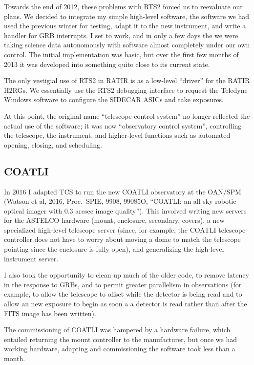 \documentclass{article}
\begin{document}
Towards the end of 2012, these problems with RTS2 forced us to reevaluate our plans. We decided to integrate my simple high-level software, the software we had used the previous winter for testing, adapt it to the new instrument, and write a handler for GRB interrupts. I set to work, and in only a few days the we were taking science data autonomously with software almost completely under our own control. The initial implementation was basic, but over the first few months of 2013 it was developed into something quite close to its current state.

The only vestigial use of RTS2 in RATIR is as a low-level “driver” for the RATIR H2RGs. We essentially use the RTS2 debugging interface to request the Teledyne Windows software to configure the SIDECAR ASICs and take exposures.

At this point, the original name “telescope control system” no longer reflected the actual use of the software; it was now “observatory control system”, controlling the telescope, the instrument, and higher-level functions such as automated opening, closing, and scheduling.

\subsection{COATLI}

In 2016 I adapted TCS to run the new COATLI observatory at the OAN/SPM (Watson et al, 2016, Proc.\ SPIE, 9908, 99085O, “COATLI: an all-sky robotic optical imager with 0.3 arcsec image quality”). This involved writing new servers for the ASTELCO hardware (mount, enclosure, secondary, covers), a new specialized high-level telescope server (since, for example, the COATLI telescope controller does not have to worry about moving a dome to match the telescope pointing since the enclosure is fully open), and generalizing the high-level instrument server.

I also took the opportunity to clean up much of the older code, to remove latency in the response to GRBs, and to permit greater parallelism in observations (for example, to allow the telescope to offset while the detector is being read and to allow an new exposure to begin as soon a a detector is read rather than after the FITS image has been written).

The commissioning of COATLI was hampered by a hardware failure, which entailed returning the mount controller to the manufacturer, but once we had working hardware, adapting and commissioning the software took less than a month.
\end{document}
